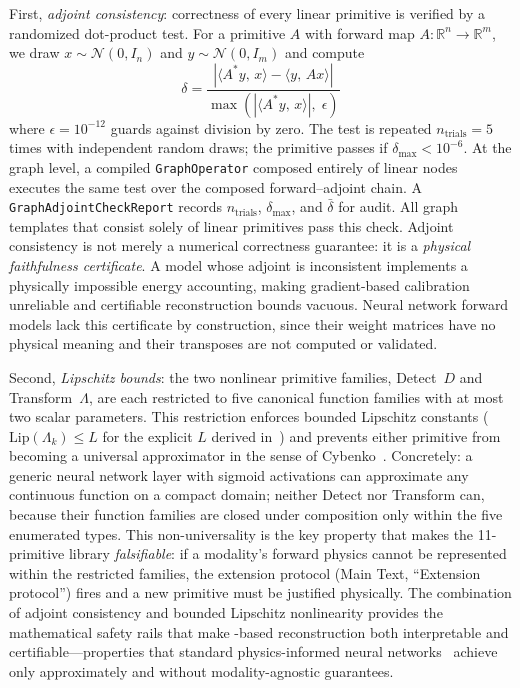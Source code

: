 First, \emph{adjoint consistency}: correctness of every linear primitive
is verified by a randomized dot-product test.  For a primitive $A$ with
forward map $A:\mathbb{R}^n \to \mathbb{R}^m$, we draw $x \sim \mathcal{N}(0,I_n)$
and $y \sim \mathcal{N}(0,I_m)$ and compute
\begin{equation}
  \delta = \frac{|\langle A^* y,\, x \rangle - \langle y,\, Ax \rangle|}
               {\max(|\langle A^* y,\, x \rangle|,\; \epsilon)}
  \label{eq:adjoint_check}
\end{equation}
where $\epsilon = 10^{-12}$ guards against division by zero.  The test
is repeated $n_{\text{trials}} = 5$ times with independent random draws;
the primitive passes if $\delta_{\max} < 10^{-6}$.  At the graph level,
a compiled \texttt{GraphOperator} composed entirely of linear nodes
executes the same test over the composed forward--adjoint chain.  A
\texttt{GraphAdjointCheckReport} records $n_{\text{trials}}$,
$\delta_{\max}$, and $\bar\delta$ for audit.  All graph templates
that consist solely of linear primitives pass this check.
Adjoint consistency is not merely a numerical correctness guarantee: it
is a \emph{physical faithfulness certificate}.  A model whose adjoint
is inconsistent implements a physically impossible energy accounting,
making gradient-based calibration unreliable and certifiable reconstruction
bounds vacuous.  Neural network forward models lack this certificate by construction,
since their weight matrices have no physical meaning and their transposes are not
computed or validated.

Second, \emph{Lipschitz bounds}: the two nonlinear primitive families,
Detect~$D$ and Transform~$\Lambda$, are each restricted to five canonical
function families with at most two scalar parameters.  This restriction
enforces bounded Lipschitz constants ($\mathrm{Lip}(\Lambda_k) \leq L$ for
the explicit $L$ derived in~\cite{yang2026fpt}) and prevents either primitive
from becoming a universal approximator in the sense of Cybenko~\cite{cybenko1989approximation}.
Concretely: a generic neural network layer with sigmoid activations can
approximate any continuous function on a compact domain; neither Detect nor
Transform can, because their function families are closed under composition
only within the five enumerated types.  This non-universality is the key
property that makes the 11-primitive library \emph{falsifiable}: if a
modality's forward physics cannot be represented within the restricted
families, the extension protocol (Main Text, ``Extension protocol'') fires
and a new primitive must be justified physically.  The combination of
adjoint consistency and bounded Lipschitz nonlinearity provides the
mathematical safety rails that make \opg{}-based reconstruction both
interpretable and certifiable---properties that standard physics-informed
neural networks~\cite{raissi2019pinn} achieve only approximately and
without modality-agnostic guarantees.

